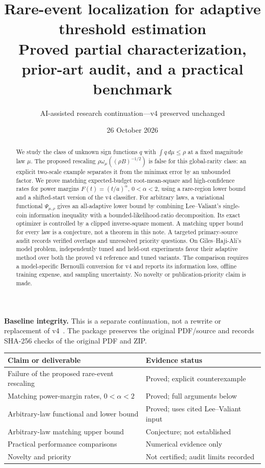 \documentclass[11pt]{article}
\title{Rare-event localization for adaptive threshold estimation\\[5pt]\large Proved partial characterization, prior-art audit, and a practical benchmark}
\author{AI-assisted research continuation\quad---\quad v4 preserved unchanged}
\date{26 October 2026}
\theoremstyle{definition}\newtheorem{conjecture}[theorem]{Conjecture}
\theoremstyle{remark}\newtheorem{remark}[theorem]{Remark}
\begin{document}
\maketitle
\begin{abstract}
We study the class of unknown sign functions $q$ with $\int q\,d\mu\le\rho$ at a fixed magnitude law $\mu$. The proposed rescaling $\rho\omega_\mu((\rho B)^{-1/2})$ is false for this global-rarity class: an explicit two-scale example separates it from the minimax error by an unbounded factor. We prove matching expected-budget root-mean-square and high-confidence rates for power margins $F(t)=(t/a)^\alpha$, $0<\alpha<2$, using a rare-region lower bound and a shifted-start version of the v4 classifier. For arbitrary laws, a variational functional $\Psi_{\mu,\rho}$ gives an all-adaptive lower bound by combining Lee--Valiant's single-coin information inequality with a bounded-likelihood-ratio decomposition. Its exact optimizer is controlled by a clipped inverse-square moment. A matching upper bound for every law is a conjecture, not a theorem in this note. A targeted primary-source audit records verified overlaps and unresolved priority questions. On Giles--Haji-Ali's model problem, independently tuned and held-out experiments favor their adaptive method over both the proved v4 reference and tuned variants. The comparison requires a model-specific Bernoulli conversion for v4 and reports its information loss, offline training expense, and sampling uncertainty. No novelty or publication-priority claim is made.
\end{abstract}

\textbf{Baseline integrity.} This is a separate continuation, not a rewrite or replacement of v4~\cite{baseline}. The package preserves the original PDF/source and records SHA-256 checks of the original PDF and ZIP.

\begin{center}\begin{tabular}{p{}p{}}\toprule
Claim or deliverable & Evidence status\\\midrule
Failure of the proposed rare-event rescaling & Proved; explicit counterexample\\
Matching power-margin rates, $0<\alpha<2$ & Proved; full arguments below\\
Arbitrary-law functional and lower bound & Proved; uses cited Lee--Valiant input\\
Arbitrary-law matching upper bound & Conjecture; not established\\
Practical performance comparisons & Numerical evidence only\\
Novelty and priority & Not certified; audit limits recorded\\\bottomrule
\end{tabular}\end{center}
\end{document}
